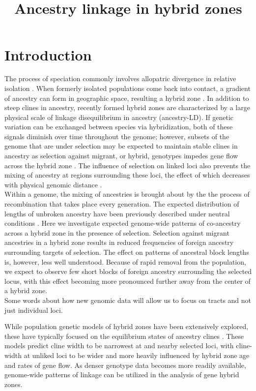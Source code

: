\documentclass[12pt]{article}
\title{Ancestry linkage in hybrid zones}
\author{}
\date{} %
\begin{document}
\maketitle

\section{Introduction}
The process of speciation commonly involves allopatric divergence in relative isolation \cite{Coyne2004}. When formerly isolated populations come back into contact, a gradient of ancestry can form in geographic space, resulting a hybrid zone \citep{Barton1985}. In addition to steep clines in ancestry, recently formed hybrid zones are characterized by a large physical scale of linkage disequilibrium in ancestry (ancestry-LD). If genetic variation can be exchanged between species via hybridization, both of these signals diminish over time throughout the genome; however, subsets of the genome that are under selection may be expected to maintain stable clines in ancestry as selection against migrant, or hybrid, genotypes impedes gene flow across the hybrid zone \citep{Barton1979a}. The influence of selection on linked loci also prevents the mixing of ancestry at regions surrounding these loci, the effect of which decreases with physical genomic distance \citep{Barton1986}.\\


Within a genome, the mixing of ancestries is brought about by the the process of recombination that takes place every generation. The expected distribution of lengths of unbroken ancestry have been previously described under neutral conditions \cite[e.g.][]{Gravel2012,Sedghifar2015}. Here we investigate expected genome-wide patterns of co-ancestry across a hybrid zone in the presence of selection. Selection against migrant ancestries in a hybrid zone results in reduced frequencies of foreign ancestry surrounding targets of selection. The effect on patterns of ancestral block lengths is, however, less well understood. Because of rapid removal from the population, we expect to observe few short blocks of foreign ancestry surrounding the selected locus, with this effect becoming more pronounced further away from the center of a hybrid zone.\\

Some words about how new genomic data will allow us to focus on tracts and not just individual loci. 

While population genetic models of hybrid zones have been extensively explored, these have typically focused on the equilibrium states of ancestry clines \cite{Barton1979a,Barton1986}. These models predict cline width to be narrowest at and nearby selected loci, with cline-width at unliked loci to be wider and more heavily influenced by hybrid zone age and rates of gene flow. As denser genotype data becomes more readily available, genome-wide patterns of linkage can be utilized in the analysis of gene hybrid zones. 
\end{document}
